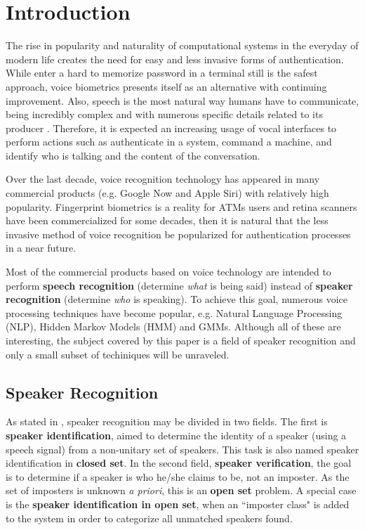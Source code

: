 \chapter{Introduction}

The rise in popularity and naturality of computational systems in the everyday of modern life creates the need for easy and less invasive forms of authentication. While enter a hard to memorize password in a terminal still is the safest approach, voice biometrics presents itself as an alternative with continuing improvement. Also, speech is the most natural way humans have to communicate, being incredibly complex and with numerous specific details related to its producer \autocite{bimbot.et.al.2004}. Therefore, it is expected an increasing usage of vocal interfaces to perform actions such as authenticate in a system, command a machine, and identify who is talking and the content of the conversation.

Over the last decade, voice recognition technology has appeared in many commercial products (e.g. Google Now and Apple Siri) with relatively high popularity. Fingerprint biometrics is a reality for ATMs users and retina scanners have been commercialized for some decades, then it is natural that the less invasive method of voice recognition be popularized for authentication processes in a near future.

Most of the commercial products based on voice technology are intended to perform \textbf{speech recognition} (determine \emph{what} is being said) instead of \textbf{speaker recognition} (determine \emph{who} is speaking). To achieve this goal, numerous voice processing techniques have become popular, e.g. Natural Language Processing (NLP), Hidden Markov Models (HMM) and GMMs. Although all of these are interesting, the subject covered by this paper is a field of speaker recognition and only a small subset of techiniques will be unraveled.

\section{Speaker Recognition}

As stated in \autocite{pinheiro.2013}, speaker recognition may be divided in two fields. The first is \textbf{speaker identification}, aimed to determine the identity of a speaker (using a speech signal) from a non-unitary set of speakers. This task is also named speaker identification in \textbf{closed set}. In the second field, \textbf{speaker verification}, the goal is to determine if a speaker is who he/she claims to be, not an imposter. As the set of imposters is unknown \emph{a priori}, this is an \textbf{open set} problem. A special case is the \textbf{speaker identification in open set}, when an ``imposter class" is added to the system in order to categorize all unmatched speakers found.

